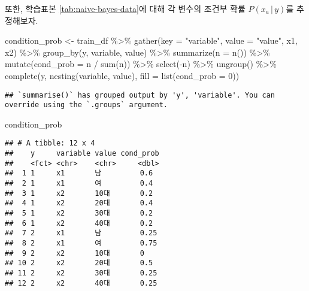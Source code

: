 \documentclass[
]{book}
\newenvironment{Shaded}{\begin{snugshade}}{\end{snugshade}}
\newcommand{\AttributeTok}[1]{\textcolor[rgb]{0.77,0.63,0.00}{#1}}
\newcommand{\DecValTok}[1]{\textcolor[rgb]{0.00,0.00,0.81}{#1}}
\newcommand{\FunctionTok}[1]{\textcolor[rgb]{0.00,0.00,0.00}{#1}}
\newcommand{\NormalTok}[1]{#1}
\newcommand{\OtherTok}[1]{\textcolor[rgb]{0.56,0.35,0.01}{#1}}
\newcommand{\SpecialCharTok}[1]{\textcolor[rgb]{0.00,0.00,0.00}{#1}}
\newcommand{\StringTok}[1]{\textcolor[rgb]{0.31,0.60,0.02}{#1}}
\begin{document}
또한, 학습표본 \ref{tab:naive-bayes-data}에 대해 각 변수의 조건부 확률 \(P(x_a \,|\, y)\)를 추정해보자.

\begin{Shaded}
\begin{Highlighting}[]
\NormalTok{condition\_prob }\OtherTok{\textless{}{-}}\NormalTok{ train\_df }\SpecialCharTok{\%\textgreater{}\%}
  \FunctionTok{gather}\NormalTok{(}\AttributeTok{key =} \StringTok{"variable"}\NormalTok{, }\AttributeTok{value =} \StringTok{"value"}\NormalTok{, x1, x2) }\SpecialCharTok{\%\textgreater{}\%}
  \FunctionTok{group\_by}\NormalTok{(y, variable, value) }\SpecialCharTok{\%\textgreater{}\%}
  \FunctionTok{summarize}\NormalTok{(}\AttributeTok{n =} \FunctionTok{n}\NormalTok{()) }\SpecialCharTok{\%\textgreater{}\%}
  \FunctionTok{mutate}\NormalTok{(}\AttributeTok{cond\_prob =}\NormalTok{ n }\SpecialCharTok{/} \FunctionTok{sum}\NormalTok{(n)) }\SpecialCharTok{\%\textgreater{}\%}
  \FunctionTok{select}\NormalTok{(}\SpecialCharTok{{-}}\NormalTok{n) }\SpecialCharTok{\%\textgreater{}\%}
  \FunctionTok{ungroup}\NormalTok{() }\SpecialCharTok{\%\textgreater{}\%}
  \FunctionTok{complete}\NormalTok{(y, }\FunctionTok{nesting}\NormalTok{(variable, value), }\AttributeTok{fill =} \FunctionTok{list}\NormalTok{(}\AttributeTok{cond\_prob =} \DecValTok{0}\NormalTok{))}
\end{Highlighting}
\end{Shaded}

\begin{verbatim}
## `summarise()` has grouped output by 'y', 'variable'. You can override using the `.groups` argument.
\end{verbatim}

\begin{Shaded}
\begin{Highlighting}[]
\NormalTok{condition\_prob}
\end{Highlighting}
\end{Shaded}

\begin{verbatim}
## # A tibble: 12 x 4
##    y     variable value cond_prob
##    <fct> <chr>    <chr>     <dbl>
##  1 1     x1       남         0.6 
##  2 1     x1       여         0.4 
##  3 1     x2       10대       0.2 
##  4 1     x2       20대       0.4 
##  5 1     x2       30대       0.2 
##  6 1     x2       40대       0.2 
##  7 2     x1       남         0.25
##  8 2     x1       여         0.75
##  9 2     x2       10대       0   
## 10 2     x2       20대       0.5 
## 11 2     x2       30대       0.25
## 12 2     x2       40대       0.25
\end{verbatim}
\end{document}
